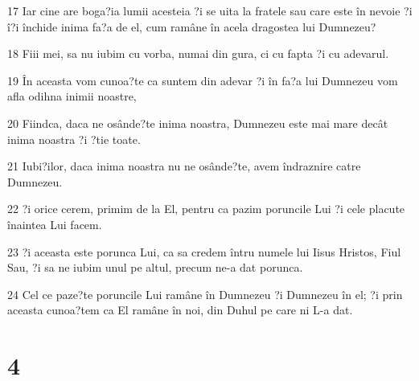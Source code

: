 \par 17 Iar cine are boga?ia lumii acesteia ?i se uita la fratele sau care este în nevoie ?i î?i închide inima fa?a de el, cum ramâne în acela dragostea lui Dumnezeu?
\par 18 Fiii mei, sa nu iubim cu vorba, numai din gura, ci cu fapta ?i cu adevarul.
\par 19 În aceasta vom cunoa?te ca suntem din adevar ?i în fa?a lui Dumnezeu vom afla odihna inimii noastre,
\par 20 Fiindca, daca ne osânde?te inima noastra, Dumnezeu este mai mare decât inima noastra ?i ?tie toate.
\par 21 Iubi?ilor, daca inima noastra nu ne osânde?te, avem îndraznire catre Dumnezeu.
\par 22 ?i orice cerem, primim de la El, pentru ca pazim poruncile Lui ?i cele placute înaintea Lui facem.
\par 23 ?i aceasta este porunca Lui, ca sa credem întru numele lui Iisus Hristos, Fiul Sau, ?i sa ne iubim unul pe altul, precum ne-a dat porunca.
\par 24 Cel ce paze?te poruncile Lui ramâne în Dumnezeu ?i Dumnezeu în el; ?i prin aceasta cunoa?tem ca El ramâne în noi, din Duhul pe care ni L-a dat.

\chapter{4}

